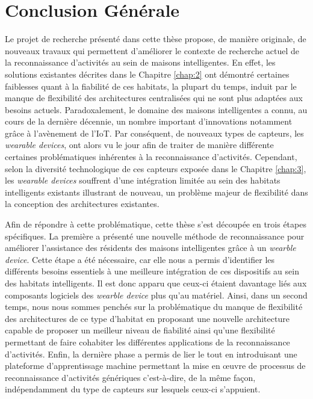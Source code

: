 \chapter{Conclusion Générale}
\label{chap:conclusion}

Le projet de recherche présenté dans cette thèse propose, de manière originale, de nouveaux travaux qui permettent d'améliorer le contexte de recherche actuel de la reconnaissance d'activités au sein de maisons intelligentes. En effet, les solutions existantes décrites dans le Chapitre \ref{chap:2} ont démontré certaines faiblesses quant à la fiabilité de ces habitats, la plupart du temps, induit par le manque de flexibilité des architectures centralisées qui ne sont plus adaptées aux besoins actuels. Paradoxalement, le domaine des maisons intelligentes a connu, au cours de la dernière décennie, un nombre important d'innovations notamment grâce à l'avènement de l'\acs{IoT}. Par conséquent, de nouveaux types de capteurs, les \textit{wearable devices}, ont alors vu le jour afin de traiter de manière différente certaines problématiques inhérentes à la reconnaissance d'activités. Cependant, selon la diversité technologique de ces capteurs exposée dans le Chapitre \ref{chap:3}, les \textit{wearable devices} souffrent d'une intégration limitée au sein des habitats intelligents existants illustrant de nouveau, un problème majeur de flexibilité dans la conception des architectures existantes.

Afin de répondre à cette problématique, cette thèse s'est découpée en trois étapes spécifiques. La première a présenté une nouvelle méthode de reconnaissance pour améliorer l'assistance des résidents des maisons intelligentes grâce à un \textit{wearble device}. Cette étape a été nécessaire, car elle nous a permis d'identifier les différents besoins essentiels à une meilleure intégration de ces dispositifs au sein des habitats intelligents. Il est donc apparu que ceux-ci étaient davantage liés aux composants logiciels des \textit{wearble device} plus qu'au matériel. Ainsi, dans un second temps, nous nous sommes penchés sur la problématique du manque de flexibilité des architectures de ce type d'habitat en proposant une nouvelle architecture capable de proposer un meilleur niveau de fiabilité ainsi qu'une flexibilité permettant de faire cohabiter les différentes applications de la reconnaissance d'activités. Enfin, la dernière phase a permis de lier le tout en introduisant une plateforme d'apprentissage machine permettant la mise en \oe{}uvre  de processus de reconnaissance d'activités génériques c'est-à-dire, de la même façon, indépendamment du type de capteurs sur lesquels ceux-ci s'appuient.

